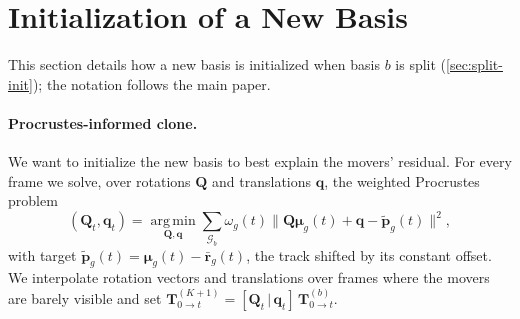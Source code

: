\clearpage
\setcounter{page}{1}
\maketitlesupplementary

\section{Initialization of a New Basis}
\label{sec:suppl-init}
This section details how a new basis is initialized when basis $b$ is split (\cref{sec:split-init}); the notation follows the main paper.

\paragraph{Procrustes-informed clone.}
We want to initialize the new basis to best explain the movers' residual. For every frame
we solve, over rotations $\mathbf{Q}$ and translations $\mathbf{q}$, the weighted Procrustes problem~\cite{umeyama1991least}
\begin{equation}
  (\mathbf{Q}_t, \mathbf{q}_t) = \operatorname*{arg\,min}_{\mathbf{Q},\mathbf{q}}
  \sum_{\mathcal{G}_b} \omega_g(t)
  \lVert \mathbf{Q}\boldsymbol{\mu}_g(t) + \mathbf{q} - \tilde{\mathbf{p}}_g(t) \rVert^2 ,
  \label{eq:procrustes}
\end{equation}
with target $\tilde{\mathbf{p}}_g(t) = \boldsymbol{\mu}_g(t) - \bar{\mathbf{r}}_g(t)$, the track shifted by its constant
offset. We interpolate rotation vectors and translations over frames where the movers are barely visible and set
$\mathbf{T}^{(K+1)}_{0\to t} = [\mathbf{Q}_t \,|\, \mathbf{q}_t]\, \mathbf{T}^{(b)}_{0\to t}$.

